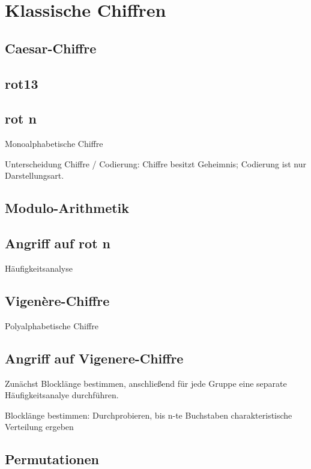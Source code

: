 \chapter{Klassische Chiffren}

\cite{Schneier1995}

\section{Caesar-Chiffre}

\section{rot13}

\section{rot n}

Monoalphabetische Chiffre

Unterscheidung Chiffre / Codierung: Chiffre besitzt Geheimnis; Codierung ist nur Darstellungsart.

\section{Modulo-Arithmetik}

\section{Angriff auf rot n}

Häufigkeitsanalyse

\section{Vigenère-Chiffre}

Polyalphabetische Chiffre

\section{Angriff auf Vigenere-Chiffre}

Zunächst Blocklänge bestimmen, anschließend für jede Gruppe eine separate Häufigkeitsanalye durchführen.

Blocklänge bestimmen: Durchprobieren, bis n-te Buchstaben charakteristische Verteilung ergeben

\section{Permutationen}


